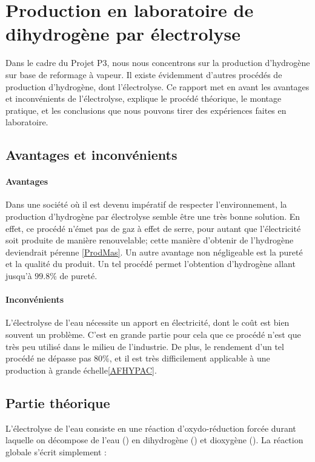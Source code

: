 \section{Production en laboratoire de dihydrogène par électrolyse}

Dans le cadre du Projet P3, nous nous concentrons sur la production d'hydrogène sur base de reformage à vapeur.
Il existe évidemment d'autres procédés de production d'hydrogène, dont l'électrolyse. Ce rapport met en avant les
avantages et inconvénients de l'électrolyse, explique le procédé théorique, le montage pratique, et les conclusions 
que nous pouvons tirer des expériences faites en laboratoire.

\subsection{Avantages et inconvénients}

\paragraph{Avantages} Dans une société où il est devenu impératif de respecter l'environnement, la production 
d'hydrogène par électrolyse semble être une très bonne solution. En effet, ce procédé n'émet pas de gaz à effet de
serre, pour autant que l'électricité soit produite de manière renouvelable; cette manière d'obtenir de l'hydrogène 
deviendrait pérenne \ref{ProdMas}. Un autre avantage non 
négligeable est la pureté et la qualité du produit. Un tel procédé permet l'obtention d'hydrogène allant jusqu'à
$99.8 \%$ de pureté.

\paragraph{Inconvénients} L'électrolyse de l'eau nécessite un apport en électricité, dont le coût est bien souvent 
un problème. C'est en grande partie pour cela que ce procédé n'est que très peu utilisé dans le milieu de l'industrie. 
De plus, le rendement d'un tel procédé ne dépasse pas $80 \%$, et il est très difficilement applicable à une production 
à grande échelle\ref{AFHYPAC}.

\subsection{Partie théorique}


L’électrolyse de l’eau consiste en une réaction d’oxydo-réduction forcée durant laquelle on décompose de l’eau ()
en dihydrogène () et dioxygène (). La réaction globale s’écrit simplement : 

